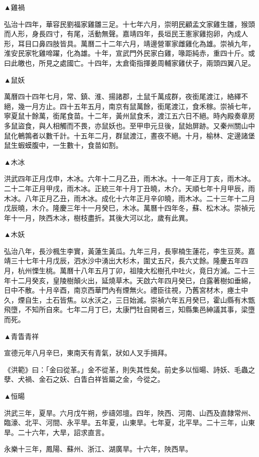 \begin{pinyinscope}
▲雞禍

弘治十四年，華容民劉福家雞雛三足。十七年六月，崇明民顧孟文家雞生雛，猴頭而人形，身長四寸，有尾，活動無聲。嘉靖四年，長垣民王憲家雞抱卵，內成人形，耳目口鼻四肢皆具。萬曆二十二年六月，靖邊營軍家雌雞化為雄。崇禎九年，淮安民家牝雞啼躍，化為雄。十年，宣武門外民家白雞，喙距純赤，重四十斤。或曰此皦也，所見之處國亡。十四年，太倉衛指揮姜周輔家雞伏子，兩頭四翼八足。

▲鼠妖

萬曆四十四年七月，常、鎮、淮、揚諸郡，土鼠千萬成群，夜銜尾渡江，絡繹不絕，幾一月方止。四十五年五月，南京有鼠萬餘，銜尾渡江，食禾稼。崇禎七年，寧夏鼠十餘萬，銜尾食苗。十二年，黃州鼠食禾，渡江五六日不絕。時內殿奏章房多鼠盜食，與人相觸而不畏，亦鼠妖也。至甲申元旦後，鼠始屏跡。又秦州關山中鼠化鵪鶉者以數千計。十五年二月，群鼠渡江，晝夜不絕。十月，榆林、定邊諸堡鼠生蝦蟆腹中，一生數十，食苗如割。

▲木冰

洪武四年正月戊申，木冰。六年十二月乙丑，雨木冰。十一年正月丁亥，雨木冰。二十二年正月甲戌，雨木冰。正統三年十月丁丑曉，木介。天順七年十月甲辰，雨木冰。八年正月乙丑，雨木冰。成化十六年正月辛卯曉，雨木冰。二十三年十二月戊辰曉，木介。隆慶三年十一月癸巳，木冰。萬曆十四年冬，蘇、松木冰。崇禎元年十一月，陜西木冰，樹枝盡折。其後大河以北，歲有此異。

▲木妖

弘治八年，長沙楓生李實，黃蓮生黃瓜。九年三月，長寧楠生蓮花，李生豆莢。嘉靖三十七年十月戊辰，泗水沙中湧出大杉木，圍丈五尺，長六丈餘。隆慶五年四月，杭州慄生桃。萬曆十八年五月丁卯，祖陵大松樹孔中吐火，竟日方滅。二十三年十二月癸亥，皇陵樹顛火出，延燒草木。天啟六年四月癸巳，白露著樹如垂綿，日中不散。十月辛酉，南京西華門內有煙無火。禮臣往視，乃舊宮材木，瘞土中久，煙自生，土石皆焦。以水沃之，三日始滅。崇禎六年五月癸巳，霍山縣有木甑飛墮，不知所自來。七年二月丁巳，太康門牡自開者三，知縣集邑紳議其事，梁墮而死。

▲青眚青祥

宣德元年八月辛巳，東南天有青氣，狀如人叉手揖拜。

《洪範》曰：「金曰從革。」金不從革，則失其性矣。前史多以恒暘、詩妖、毛蟲之孽、犬禍、金石之妖、白眚白祥皆屬之金，今從之。

▲恒暘

洪武三年，夏旱。六月戊午朔，步禱郊壇。四年，陜西、河南、山西及直隸常州、臨濠、北平、河間、永平旱。五年夏，山東旱。七年夏，北平旱。二十三年，山東旱。二十六年，大旱，詔求直言。

永樂十三年，鳳陽、蘇州、浙江、湖廣旱。十六年，陜西旱。


\end{pinyinscope}
